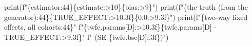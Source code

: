 \documentclass[
  letterpaper,
  10pt,
  twoside,
  openright,
  numbers=noenddot,
  chapterprefix=true]{scrbook}
\newenvironment{Shaded}{}{}
\newcommand{\BuiltInTok}[1]{\textcolor[rgb]{0.84,0.23,0.29}{#1}}
\newcommand{\FloatTok}[1]{\textcolor[rgb]{0.00,0.36,0.77}{#1}}
\newcommand{\NormalTok}[1]{\textcolor[rgb]{0.14,0.16,0.18}{#1}}
\newcommand{\OperatorTok}[1]{\textcolor[rgb]{0.14,0.16,0.18}{#1}}
\newcommand{\SpecialCharTok}[1]{\textcolor[rgb]{0.00,0.36,0.77}{#1}}
\newcommand{\SpecialStringTok}[1]{\textcolor[rgb]{0.01,0.18,0.38}{#1}}
\newcommand{\StringTok}[1]{\textcolor[rgb]{0.01,0.18,0.38}{#1}}
\begin{document}
\begin{Shaded}
\begin{Highlighting}[]
\BuiltInTok{print}\NormalTok{(}\SpecialStringTok{f"}\SpecialCharTok{\{}\StringTok{\textquotesingle{}estimator\textquotesingle{}}\SpecialCharTok{:44\}\{}\StringTok{\textquotesingle{}estimate\textquotesingle{}}\SpecialCharTok{:\textgreater{}10\}\{}\StringTok{\textquotesingle{}bias\textquotesingle{}}\SpecialCharTok{:\textgreater{}9\}}\SpecialStringTok{"}\NormalTok{)}
\BuiltInTok{print}\NormalTok{(}\SpecialStringTok{f"}\SpecialCharTok{\{}\StringTok{\textquotesingle{}the truth (from the generator)\textquotesingle{}}\SpecialCharTok{:44\}\{}\NormalTok{TRUE\_EFFECT}\SpecialCharTok{:\textgreater{}10.3f\}\{}\FloatTok{0.0}\SpecialCharTok{:\textgreater{}9.3f\}}\SpecialStringTok{"}\NormalTok{)}
\BuiltInTok{print}\NormalTok{(}\SpecialStringTok{f"}\SpecialCharTok{\{}\StringTok{\textquotesingle{}two{-}way fixed effects, all cohorts\textquotesingle{}}\SpecialCharTok{:44\}}\SpecialStringTok{"}
      \SpecialStringTok{f"}\SpecialCharTok{\{}\NormalTok{twfe}\SpecialCharTok{.}\NormalTok{params[D]}\SpecialCharTok{:\textgreater{}10.3f\}\{}\NormalTok{twfe}\SpecialCharTok{.}\NormalTok{params[D] }\OperatorTok{{-}}\NormalTok{ TRUE\_EFFECT}\SpecialCharTok{:\textgreater{}9.3f\}}\SpecialStringTok{"}
      \SpecialStringTok{f"   (SE }\SpecialCharTok{\{}\NormalTok{twfe}\SpecialCharTok{.}\NormalTok{bse[D]}\SpecialCharTok{:.3f\}}\SpecialStringTok{)"}\NormalTok{)}


\end{Highlighting}
\end{Shaded}
\end{document}
